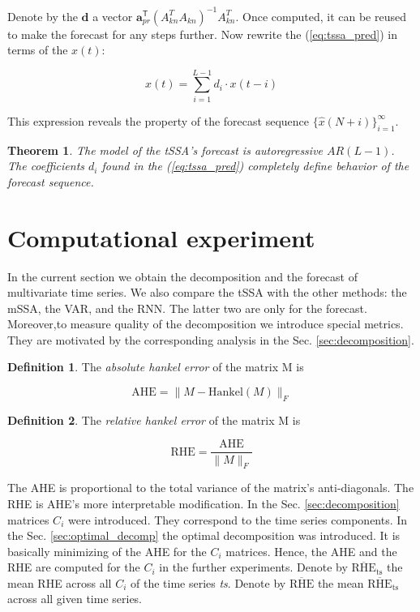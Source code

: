 \documentclass[referee, pdflatex, sn-mathphys-num]{sn-jnl}
\theoremstyle{definition}
\newtheorem*{Def}{Definition}
\theoremstyle{plain}
\newtheorem{Th}{Theorem}
\begin{document}
	Denote by the $ \mathbf{d} $ a vector $ \mathbf{a}_{pr}^{\mathsf{T}} (A_{kn}^T A_{kn})^{-1} A_{kn}^T $. Once computed, it can be reused to make the forecast for any steps further. Now rewrite the (\ref{eq:tssa_pred}) in terms of the $ x(t) $:
	
	\begin{equation*}\label{eq:autoregr}
		x(t) = \sum\limits_{i = 1}^{L - 1} d_i \cdot x(t - i)
	\end{equation*}
	
	This expression reveals the property of the forecast sequence $ \{\hat{x}(N + i)\}_{i=1}^{\infty} $.
	
	\begin{Th}		
		The model of the tSSA's forecast is \emph{autoregressive} $ AR(L - 1) $. The coefficients $ d_i $ found in the (\ref{eq:tssa_pred}) completely define behavior of the forecast sequence.
	\end{Th}
	
	\section{Computational experiment}	
	
	In the current section we obtain the decomposition and the forecast of multivariate time series. We also compare the tSSA with the other methods: the mSSA, the VAR, and the RNN. The latter two are only for the forecast. Moreover,to measure quality of the decomposition we introduce special metrics. They are motivated by the corresponding analysis in the Sec. \ref{sec:decomposition}.
	
	\begin{Def}
		The \emph{absolute hankel error} of the matrix M is 
		
		\[
		\text{AHE} = \lVert M - \text{Hankel}(M) \rVert_F
		\] 
		
	\end{Def}	
	
	\begin{Def}		
		
		The \emph{relative hankel error} of the matrix M is 
		
		\[
		\text{RHE} = \frac{\text{AHE}}{\lVert M \rVert_F} 
		\] 		
		
	\end{Def}
	
	The AHE is proportional to the total variance of the matrix's anti-diagonals. The RHE is AHE's more interpretable modification. In the Sec. \ref{sec:decomposition} matrices $ C_i $ were introduced. They correspond to the time series components. In the Sec. \ref{sec:optimal_decomp} the optimal decomposition was introduced. It is basically minimizing of the AHE for the $ C_i $ matrices. Hence, the AHE and the RHE are computed for the $ C_i $ in the further experiments. Denote by $ \overline{\text{RHE}}_{\text{ts}} $ the mean RHE across all $ C_i $ of the time series \textit{ts}. Denote by $ \overline{\text{RHE}} $ the mean $ \overline{\text{RHE}}_{\text{ts}} $ across all given time series.
	
\end{document}
